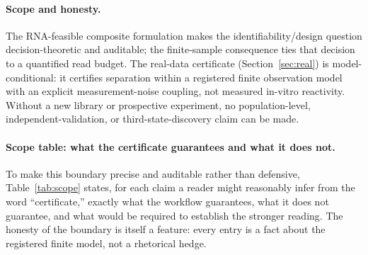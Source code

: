 \documentclass[11pt]{article}
\begin{document}
\paragraph{Scope and honesty.}
The RNA-feasible composite formulation makes the identifiability/design question decision-theoretic and
auditable; the finite-sample consequence ties that decision to a quantified read budget. The real-data
certificate (Section~\ref{sec:real}) is model-conditional: it certifies separation within a registered
finite observation model with an explicit measurement-noise coupling, not measured in-vitro reactivity.
Without a new library or prospective experiment, no population-level, independent-validation, or
third-state-discovery claim can be made.

\paragraph{Scope table: what the certificate guarantees and what it does not.}
To make this boundary precise and auditable rather than defensive, Table~\ref{tab:scope} states, for
each claim a reader might reasonably infer from the word ``certificate,'' exactly what the workflow
guarantees, what it does not guarantee, and what would be required to establish the stronger reading.
The honesty of the boundary is itself a feature: every entry is a fact about the registered finite
model, not a rhetorical hedge.
\end{document}

